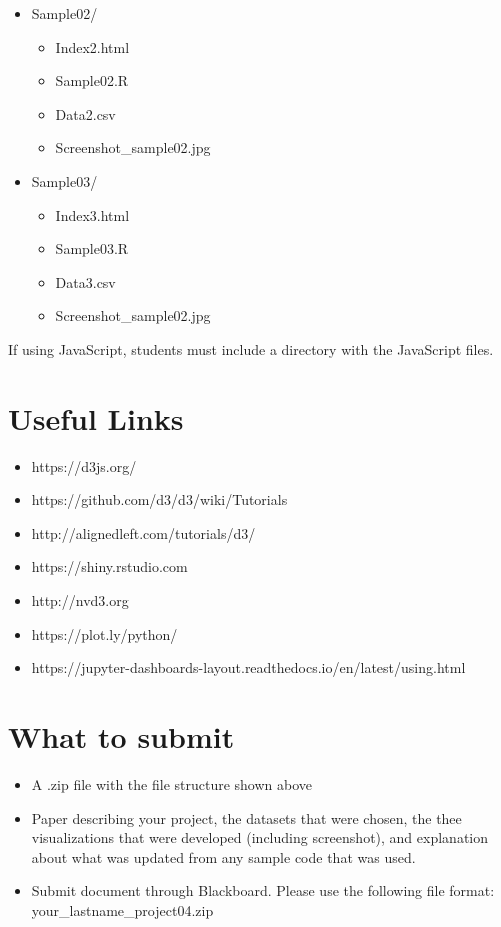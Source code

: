 \documentclass{article}
\begin{document}
\begin{enumerate}
\begin{itemize}
\begin{itemize}
            \item Sample02/
            \begin{itemize}
                \item Index2.html
                \item Sample02.R
                \item Data2.csv
                \item Screenshot\_sample02.jpg
            \end{itemize}

            \item Sample03/
            \begin{itemize}
                \item Index3.html
                \item Sample03.R
                \item Data3.csv
                \item Screenshot\_sample02.jpg
            \end{itemize}

        \end{itemize}
    \end{itemize}
    If using JavaScript, students must include a directory with the JavaScript files.


\end{enumerate}

\section{Useful Links}
\begin{itemize}
    \item https://d3js.org/
    \item https://github.com/d3/d3/wiki/Tutorials
    \item http://alignedleft.com/tutorials/d3/
    \item https://shiny.rstudio.com
    \item http://nvd3.org
    \item https://plot.ly/python/
    \item https://jupyter-dashboards-layout.readthedocs.io/en/latest/using.html
\end{itemize}

\section{What to submit}
\begin{itemize}
    \item A .zip file with the file structure shown above
    \item Paper describing your project, the datasets that were chosen, the thee visualizations that were developed (including screenshot), and explanation about what was updated from any sample code that was used. 
    \item Submit document through Blackboard.  Please use the following file format: your\_lastname\_project04.zip

\end{itemize}
\end{document}
